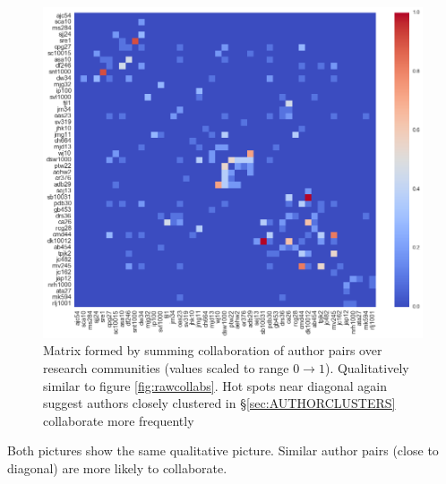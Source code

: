   \begin{figure}
    \includegraphics[width=\textwidth]{Analysis/comm_collabs.png}
    \caption{Matrix formed by summing collaboration of author pairs over research communities (values scaled to range $0 \rightarrow 1$). Qualitatively similar to figure \ref{fig:rawcollabs}. Hot spots near diagonal again suggest authors closely clustered in \S\ref{sec:AUTHORCLUSTERS} collaborate more frequently }
      \label{fig:collcollabs}

\end{figure}

Both pictures show the same qualitative picture. Similar author pairs (close to diagonal) are more likely to collaborate. 


